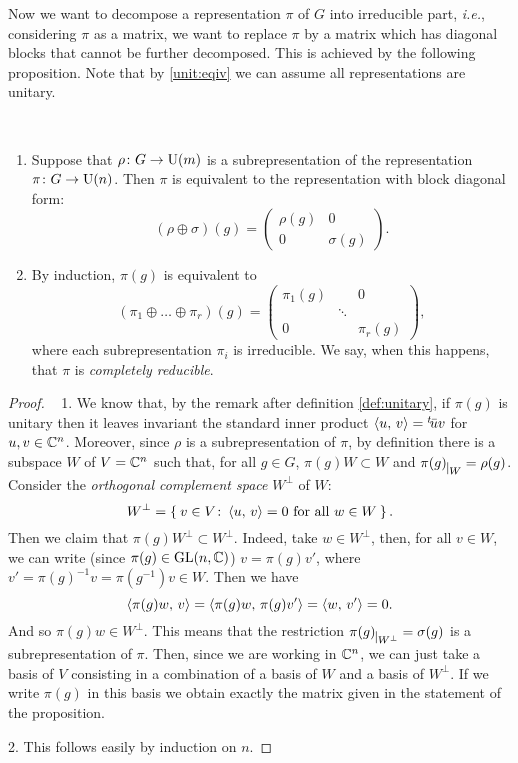 Now we want to decompose a representation $\pi$ of $G$ into irreducible part, \textit{i.e.}, considering $\pi$ as a matrix, we want to replace $\pi$ by a matrix which has diagonal blocks that cannot be further decomposed. This is achieved by the following proposition.
Note that by \ref{unit:eqiv} we can assume all representations are unitary.
\begin{prop}~ 
\label{thm:complred}
\begin{enumerate}
\item Suppose that $\rho\colon G\rightarrow \operatorname{U}(m)$ is a subrepresentation of the representation $\pi\colon G\rightarrow \operatorname{U}(n)$. Then $\pi$ is equivalent to the representation with block diagonal form:
\[(\rho \oplus \sigma)(g)=
\begin{pmatrix}
\rho(g) & 0 \\
0 		& \sigma(g)
\end{pmatrix}.
\]
\item By induction, $\pi(g)$ is equivalent to
\[
(\pi_1\oplus\dots \oplus \pi_r)(g)= 
\begin{pmatrix}
\pi_1(g)  &{} &0\\
{} &\ddots &{} \\
0 &{}  &\pi_r(g)
\end{pmatrix},
\]
where each subrepresentation $\pi_i$  is irreducible. We say, when this happens, that $\pi$ is \emph{completely reducible}. 
\end{enumerate}
\end{prop}
\begin{proof}~
1. We know that, by the remark after definition \ref{def:unitary}, if $\pi(g)$ is unitary then it leaves invariant the standard inner product $\braket{u,\, v}={}^t\!\bar{u}v$ for $u,v \in {\mathbb C}^n$. Moreover, since $\rho$ is a subrepresentation of $\pi$, by definition there is a subspace $W$ of $V={\mathbb C}^n$ such that, for all $g\in G$, $\pi(g)W\subset W$ and $\pi(g)_{\mkern 1mu \vrule height 2ex\mkern2mu W}= \rho(g)$.  Consider the \emph{orthogonal complement space} $W^\perp$ of $W$:
\[
W^{\perp}= \Set{v \in V \colon \braket{u, \, v}=0 \text{ for all } w \in W}.
\]
Then we claim that $\pi(g)W^{\perp}\subset W^{\perp}$. Indeed, take $w\in W^{\perp}$, then, for all $v\in W$, we can write (since $\pi(g) \in \operatorname{GL}(n,{\mathbb C})$) $v=\pi(g)v'$, where $v'=\pi(g)^{-1}v=\pi(g^{-1})v \in W$. Then we have 
\[
\braket{\pi(g)w,\, v}=\braket{\pi(g)w,\, \pi(g)v'}=\braket{w,\, v'}=0.
\]
And so $\pi(g)w\in W^{\perp}$. This means that the restriction $\pi(g)_{\mkern 1mu \vrule height 2ex\mkern2mu W^{\perp}}= \sigma(g)$ is a subrepresentation of $\pi$.  Then, since we are working in ${\mathbb C}^n$, we can just take a basis of $V$ consisting in a combination of a basis of $W$ and a basis of $W^{\perp}$. If we write $\pi(g)$ in this basis we obtain exactly the matrix given in the statement of the proposition.

2. This follows easily by induction on $n$.
\end{proof}

